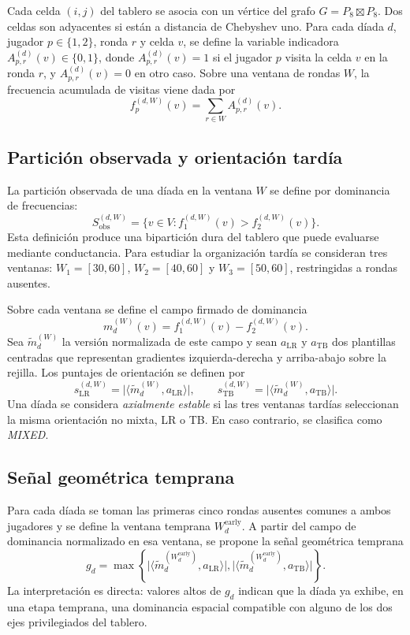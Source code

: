\documentclass[journal]{IEEEtran}
\newcommand{\Sobs}{S_{\mathrm{obs}}}
\begin{document}
Cada celda $(i,j)$ del tablero se asocia con un vértice del grafo $G=P_8 \boxtimes P_8$. Dos celdas son adyacentes si están a distancia de Chebyshev uno. Para cada díada $d$, jugador $p \in \{1,2\}$, ronda $r$ y celda $v$, se define la variable indicadora $A_{p,r}^{(d)}(v)\in\{0,1\}$, donde $A_{p,r}^{(d)}(v)=1$ si el jugador $p$ visita la celda $v$ en la ronda $r$, y $A_{p,r}^{(d)}(v)=0$ en otro caso.
Sobre una ventana de rondas $W$, la frecuencia acumulada de visitas viene dada por
\[
f_p^{(d,W)}(v)=\sum_{r\in W} A_{p,r}^{(d)}(v).
\]

\subsection{Partición observada y orientación tardía}

La partición observada de una díada en la ventana $W$ se define por dominancia de frecuencias:
\begin{equation}
\Sobs^{(d,W)}=\{v \in V : f_1^{(d,W)}(v) > f_2^{(d,W)}(v)\}.
\end{equation}
Esta definición produce una bipartición dura del tablero que puede evaluarse mediante conductancia. Para estudiar la organización tardía se consideran tres ventanas: $W_1=[30,60]$, $W_2=[40,60]$ y $W_3=[50,60]$, restringidas a rondas ausentes.

Sobre cada ventana se define el campo firmado de dominancia
\[
m_d^{(W)}(v)=f_1^{(d,W)}(v)-f_2^{(d,W)}(v).
\]
Sea $\tilde m_d^{(W)}$ la versión normalizada de este campo y sean $a_{\mathrm{LR}}$ y $a_{\mathrm{TB}}$ dos plantillas centradas que representan gradientes izquierda-derecha y arriba-abajo sobre la rejilla. Los puntajes de orientación se definen por
\[
s_{\mathrm{LR}}^{(d,W)} = \big|\langle \tilde m_d^{(W)}, a_{\mathrm{LR}} \rangle\big|,
\qquad
s_{\mathrm{TB}}^{(d,W)} = \big|\langle \tilde m_d^{(W)}, a_{\mathrm{TB}} \rangle\big|.
\]
Una díada se considera \emph{axialmente estable} si las tres ventanas tardías seleccionan la misma orientación no mixta, LR o TB. En caso contrario, se clasifica como \emph{MIXED}.

\subsection{Señal geométrica temprana}

Para cada díada se toman las primeras cinco rondas ausentes comunes a ambos jugadores y se define la ventana temprana $W_d^{\mathrm{early}}$. A partir del campo de dominancia normalizado en esa ventana, se propone la señal geométrica temprana
\begin{equation}
g_d = \max \left\{
\big|\langle \tilde m_d^{(W_d^{\mathrm{early}})}, a_{\mathrm{LR}} \rangle\big|,
\big|\langle \tilde m_d^{(W_d^{\mathrm{early}})}, a_{\mathrm{TB}} \rangle\big|
\right\}.
\end{equation}
La interpretación es directa: valores altos de $g_d$ indican que la díada ya exhibe, en una etapa temprana, una dominancia espacial compatible con alguno de los dos ejes privilegiados del tablero.
\end{document}
